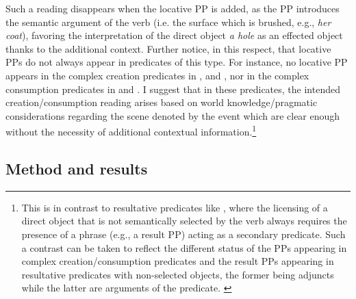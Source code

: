 \documentclass[output=paper,colorlinks,citecolor=brown]{langscibook}
\begin{document}
Such a reading disappears when the locative PP is added, as the PP introduces the semantic argument of the verb (i.e. the surface which is brushed, e.g., \textit{her coat}), favoring the interpretation of the direct object \textit{a hole} as an effected object thanks to the additional context. Further notice, in this respect, that locative PPs do not always appear in predicates of this type. For instance, no locative PP appears in the complex creation predicates in ,  and , nor in the complex consumption predicates in  and . I suggest that in these predicates, the intended creation/consumption reading arises based on world knowledge/pragmatic considerations regarding the scene denoted by the event which are clear enough without the necessity of additional contextual information.\footnote{This is in contrast to resultative predicates like , where the licensing of a direct object that is not semantically selected by the verb always requires the presence of a phrase (e.g., a result PP) acting as a secondary predicate. Such a contrast can be taken to reflect the different status of the PPs appearing in complex creation/consumption predicates and the result PPs appearing in resultative predicates with non-selected objects, the former being adjuncts while the latter are arguments of the predicate. \label{PPareadjuncts} } %



\subsection{Method and results} \label{2.2}
\end{document}

